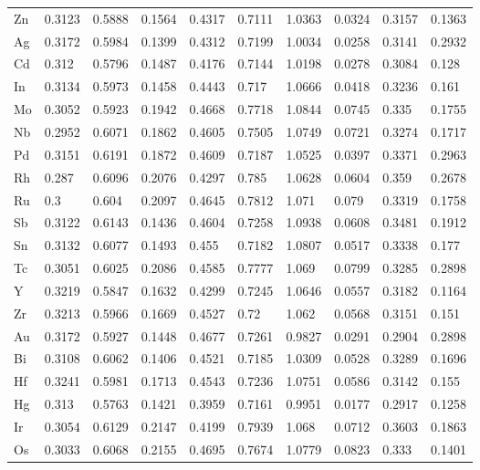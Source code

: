 \begin{table}[h]
{\begin{tabular}{*{10}{l}}
      Zn & 0.3123 & 0.5888 & 0.1564 & 0.4317 & 0.7111 & 1.0363 & 0.0324 & 0.3157 & 0.1363 \\
      Ag & 0.3172 & 0.5984 & 0.1399 & 0.4312 & 0.7199 & 1.0034 & 0.0258 & 0.3141 & 0.2932 \\
      Cd & 0.312  & 0.5796 & 0.1487 & 0.4176 & 0.7144 & 1.0198 & 0.0278 & 0.3084 & 0.128  \\
      In & 0.3134 & 0.5973 & 0.1458 & 0.4443 & 0.717  & 1.0666 & 0.0418 & 0.3236 & 0.161  \\
      Mo & 0.3052 & 0.5923 & 0.1942 & 0.4668 & 0.7718 & 1.0844 & 0.0745 & 0.335  & 0.1755 \\
      Nb & 0.2952 & 0.6071 & 0.1862 & 0.4605 & 0.7505 & 1.0749 & 0.0721 & 0.3274 & 0.1717 \\
      Pd & 0.3151 & 0.6191 & 0.1872 & 0.4609 & 0.7187 & 1.0525 & 0.0397 & 0.3371 & 0.2963 \\
      Rh & 0.287  & 0.6096 & 0.2076 & 0.4297 & 0.785  & 1.0628 & 0.0604 & 0.359  & 0.2678 \\
      Ru & 0.3    & 0.604  & 0.2097 & 0.4645 & 0.7812 & 1.071  & 0.079  & 0.3319 & 0.1758 \\
      Sb & 0.3122 & 0.6143 & 0.1436 & 0.4604 & 0.7258 & 1.0938 & 0.0608 & 0.3481 & 0.1912 \\
      Sn & 0.3132 & 0.6077 & 0.1493 & 0.455  & 0.7182 & 1.0807 & 0.0517 & 0.3338 & 0.177  \\
      Tc & 0.3051 & 0.6025 & 0.2086 & 0.4585 & 0.7777 & 1.069  & 0.0799 & 0.3285 & 0.2898 \\
      Y  & 0.3219 & 0.5847 & 0.1632 & 0.4299 & 0.7245 & 1.0646 & 0.0557 & 0.3182 & 0.1164 \\
      Zr & 0.3213 & 0.5966 & 0.1669 & 0.4527 & 0.72   & 1.062  & 0.0568 & 0.3151 & 0.151  \\
      Au & 0.3172 & 0.5927 & 0.1448 & 0.4677 & 0.7261 & 0.9827 & 0.0291 & 0.2904 & 0.2898 \\
      Bi & 0.3108 & 0.6062 & 0.1406 & 0.4521 & 0.7185 & 1.0309 & 0.0528 & 0.3289 & 0.1696 \\
      Hf & 0.3241 & 0.5981 & 0.1713 & 0.4543 & 0.7236 & 1.0751 & 0.0586 & 0.3142 & 0.155  \\
      Hg & 0.313  & 0.5763 & 0.1421 & 0.3959 & 0.7161 & 0.9951 & 0.0177 & 0.2917 & 0.1258 \\
      Ir & 0.3054 & 0.6129 & 0.2147 & 0.4199 & 0.7939 & 1.068  & 0.0712 & 0.3603 & 0.1863 \\
      Os & 0.3033 & 0.6068 & 0.2155 & 0.4695 & 0.7674 & 1.0779 & 0.0823 & 0.333  & 0.1401 \\

\end{tabular}}
\end{table}
